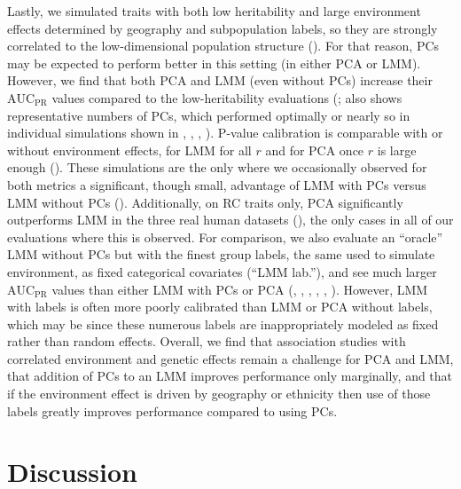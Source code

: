 \documentclass[9pt,lineno]{elife}
\newcommand{\auc}{\text{AUC}_\text{PR}}
\begin{document}
Lastly, we simulated traits with both low heritability and large environment effects determined by geography and subpopulation labels, so they are strongly correlated to the low-dimensional population structure ().
For that reason, PCs may be expected to perform better in this setting (in either PCA or LMM).
However, we find that both PCA and LMM (even without PCs) increase their $\auc$ values compared to the low-heritability evaluations (;  also shows representative numbers of PCs, which performed optimally or nearly so in individual simulations shown in , , , ).
P-value calibration is comparable with or without environment effects, for LMM for all $r$ and for PCA once $r$ is large enough ().
These simulations are the only where we occasionally observed for both metrics a significant, though small, advantage of LMM with PCs versus LMM without PCs ().
Additionally, on RC traits only, PCA significantly outperforms LMM in the three real human datasets (), the only cases in all of our evaluations where this is observed.
For comparison, we also evaluate an ``oracle'' LMM without PCs but with the finest group labels, the same used to simulate environment, as fixed categorical covariates (``LMM lab.''), and see much larger $\auc$ values than either LMM with PCs or PCA (,
, , , , ).
However, LMM with labels is often more poorly calibrated than LMM or PCA without labels, which may be since these numerous labels are inappropriately modeled as fixed rather than random effects.
Overall, we find that association studies with correlated environment and genetic effects remain a challenge for PCA and LMM, that addition of PCs to an LMM improves performance only marginally, and that if the environment effect is driven by geography or ethnicity then use of those labels greatly improves performance compared to using PCs.

\section{Discussion}
\end{document}
